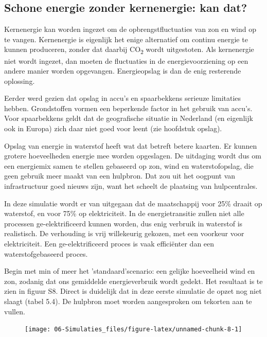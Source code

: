 \documentclass[
  11pt,
  a4paper,
]{book}
\begin{document}
\newpage

\hypertarget{schone-energie-zonder-kernenergie-kan-dat}{%
\subsection{Schone energie zonder kernenergie: kan dat?}\label{schone-energie-zonder-kernenergie-kan-dat}}

Kernenergie kan worden ingezet om de opbrengstfluctuaties van zon en wind op te vangen. Kernenergie is eigenlijk het enige alternatief om continu energie te kunnen produceren, zonder dat daarbij CO\textsubscript{2} wordt uitgestoten. Als kernenergie niet wordt ingezet, dan moeten de fluctuaties in de energievoorziening op een andere manier worden opgevangen. Energieopslag is dan de enig resterende oplossing.

Eerder werd gezien dat opslag in accu's en spaarbekkens serieuze limitaties hebben. Grondstoffen vormen een beperkende factor in het gebruik van accu's. Voor spaarbekkens geldt dat de geografische situatie in Nederland (en eigenlijk ook in Europa) zich daar niet goed voor leent (zie hoofdstuk opslag).

Opslag van energie in waterstof heeft wat dat betreft betere kaarten. Er kunnen grotere hoeveelheden energie mee worden opgeslagen. De uitdaging wordt dus om een energiemix samen te stellen gebaseerd op zon, wind en waterstofopslag, die geen gebruik meer maakt van een hulpbron. Dat zou uit het oogpunt van infrastructuur goed nieuws zijn, want het scheelt de plaatsing van hulpcentrales.

In deze simulatie wordt er van uitgegaan dat de maatschappij voor 25\% draait op waterstof, en voor 75\% op elektriciteit. In de energietransitie zullen niet alle processen ge-elektrificeerd kunnen worden, dus enig verbruik in waterstof is realistisch. De verhouding is vrij willekeurig gekozen, met een voorkeur voor elektriciteit. Een ge-elektrificeerd proces is vaak efficiënter dan een waterstofgebaseerd proces.

Begin met min of meer het 'standaard'scenario: een gelijke hoeveelheid wind en zon, zodanig dat ons gemiddelde energieverbruik wordt gedekt. Het resultaat is te zien in figuur S8. Direct is duidelijk dat in deze eerste simulatie de opzet nog niet slaagt (tabel 5.4). De hulpbron moet worden aangesproken om tekorten aan te vullen.

\begin{figure}

{\centering \texttt{[image: 06-Simulaties\_files/figure-latex/unnamed-chunk-8-1]} 

}

\end{figure}
\end{document}
